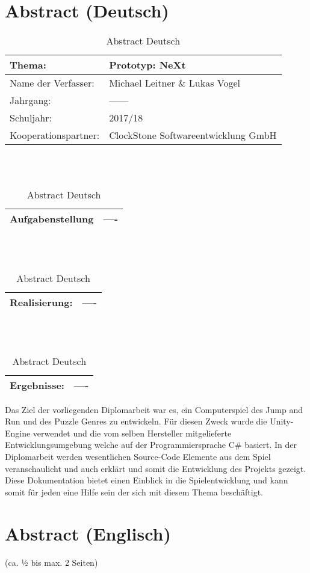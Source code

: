 \chapter*{Abstract (Deutsch)}
\begin{table}
	\caption{Abstract Deutsch}
\begin{tabular}{|l|l|}
	\hline 
	Thema: &  Prototyp: NeXt\\ 
	\hline
	 Name der Verfasser: & Michael Leitner \& Lukas Vogel  \\ 
	\hline 
	Jahrgang: & ------ \\
	\hline
	 Schuljahr: & 2017/18 \\
	\hline 
	Kooperationspartner: & ClockStone Softwareentwicklung GmbH\\
	\hline
\end{tabular}
\\
\\
\begin{tabular}{|l|l|}
	\hline
	Aufgabenstellung & ---- \\
	\hline
\end{tabular} 
\\
\\
\begin{tabular}{|l|l|}
	\hline
	Realisierung: & ----\\
	\hline
\end{tabular}
\\
\\
\begin{tabular}{|l|l|}
	\hline
	Ergebnisse: & ----\\
	\hline
\end{tabular}
\end{table}
Das Ziel der vorliegenden Diplomarbeit war es, ein Computerspiel des Jump and Run und des Puzzle Genres zu entwickeln. Für diesen Zweck wurde die Unity-Engine verwendet und die vom selben Hersteller mitgelieferte Entwicklungsumgebung welche auf der Programmiersprache C\# basiert. In der Diplomarbeit werden wesentlichen Source-Code Elemente aus dem Spiel veranschaulicht und auch erklärt und somit die Entwicklung des Projekts gezeigt. Diese Dokumentation bietet einen Einblick in die Spielentwicklung und kann somit für jeden eine Hilfe sein der sich mit diesem Thema beschäftigt.

\chapter*{Abstract (Englisch)}
(ca. ½ bis max. 2 Seiten)